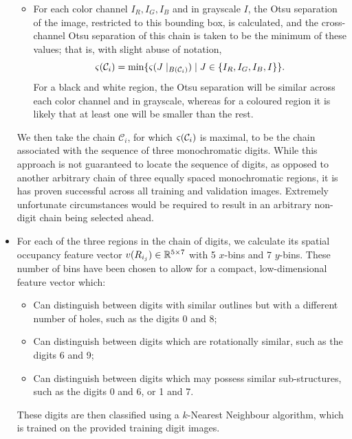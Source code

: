 \documentclass{article}
\begin{document}
\begin{itemize}
\begin{itemize}
  \item
    For each color channel $I_{R}, I_{G}, I_{B}$ and in grayscale $I$, the Otsu
    separation of the image, restricted to this bounding box, is calculated, and
    the cross-channel Otsu separation of this chain is taken to be the minimum
    of these values; that is, with slight abuse of notation,
    \begin{equation*}
      \varsigma(\mathcal{C}_{i})
      =
      \min
      \lbrace
        \varsigma(J\mid_{B(\mathcal{C}_{i})})
        \mid
        J
        \in
        \lbrace
          I_{R}
          ,
          I_{G}
          ,
          I_{B}
          ,
          I
        \rbrace
      \rbrace
      .
    \end{equation*}
    For a black and white region, the Otsu separation will be similar across
    each color channel and in grayscale, whereas for a coloured region it is
    likely that at least one will be smaller than the rest.
  \end{itemize}
  We then take the chain $\mathcal{C}_{i}$, for which
  $\varsigma(\mathcal{C}_{i})$ is maximal, to be the chain associated with
  the sequence of three monochromatic digits.
  While this approach is not guaranteed to locate the sequence of digits, as
  opposed to another arbitrary chain of three equally spaced monochromatic
  regions, it is has proven successful across all training and validation
  images.
  Extremely unfortunate circumstances would be required to result in an
  arbitrary non-digit chain being selected ahead.

\item
  For each of the three regions in the chain of digits, we calculate its spatial
  occupancy feature vector $v(R_{i_{j}}) \in \mathbb{R}^{5 \times 7}$ with 5
  $x$-bins and 7 $y$-bins.
  These number of bins have been chosen to allow for a compact, low-dimensional
  feature vector which:
  \begin{itemize}
  \item
    Can distinguish between digits with similar outlines but with a different
    number of holes, such as the digits 0 and 8;

  \item
    Can distinguish between digits which are rotationally similar, such as the
    digits 6 and 9;

  \item
    Can distinguish between digits which may possess similar sub-structures,
    such as the digits 0 and 6, or 1 and 7.
  \end{itemize}
  These digits are then classified using a $k$-Nearest Neighbour algorithm,
  which is trained on the provided training digit images.
\end{itemize}
\end{document}
